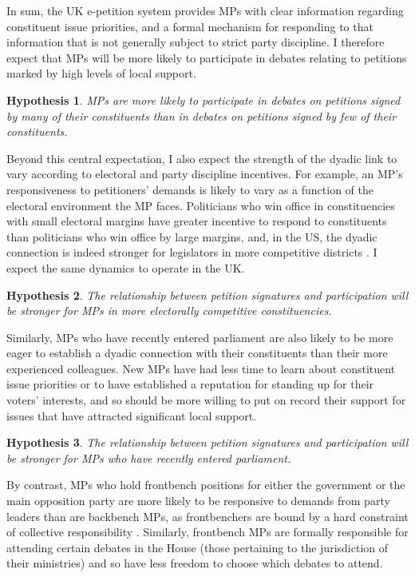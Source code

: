 \documentclass[12pt]{article}
\newtheorem{hypothesis}{\small\sc Hypothesis}
\begin{document}
In sum, the UK e-petition system provides MPs with clear information regarding constituent issue priorities, and a formal mechanism for responding to that information that is not generally subject to strict party discipline. I therefore expect that MPs will be more likely to participate in debates relating to petitions marked by high levels of local support.

\begin{hypothesis} \label{hyp:baseline}
MPs are more likely to participate in debates on petitions signed by many of their constituents than in debates on petitions signed by few of their constituents.
\end{hypothesis} 

Beyond this central expectation, I also expect the strength of the dyadic link to vary according to electoral and party discipline incentives. For example, an MP's responsiveness to petitioners' demands is likely to vary as a function of the electoral environment the MP faces. Politicians who win office in constituencies with small electoral margins have greater incentive to respond to constituents than politicians who win office by large margins, and, in the US, the dyadic connection is indeed stronger for legislators in more competitive districts \citep{griffin2006electoral}. I expect the same dynamics to operate in the UK. 

\begin{hypothesis} \label{hyp:margin}
The relationship between petition signatures and participation will be stronger for MPs in more electorally competitive constituencies.
\end{hypothesis} 

Similarly, MPs who have recently entered parliament are also likely to be more eager to establish a dyadic connection with their constituents than their more experienced colleagues. New MPs have had less time to learn about constituent issue priorities or to have established a reputation for standing up for their voters' interests, and so should be more willing to put on record their support for issues that have attracted significant local support. 

\begin{hypothesis} \label{hyp:newmp}
The relationship between petition signatures and participation will be stronger for MPs who have recently entered parliament.
\end{hypothesis} 

By contrast, MPs who hold frontbench positions for either the government or the main opposition party are more likely to be responsive to demands from party leaders than are backbench MPs, as frontbenchers are bound by a hard constraint of collective responsibility \citep{benedetto2007rejected}. Similarly, frontbench MPs are formally responsible for attending certain debates in the House (those pertaining to the jurisdiction of their ministries) and so have less freedom to choose which debates to attend. 
\end{document}
